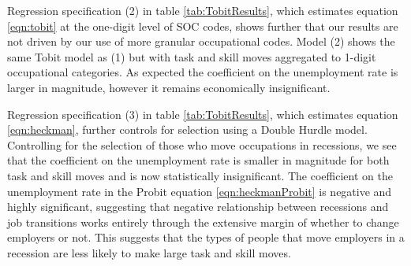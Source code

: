 \documentclass[12pt,authoryear]{elsarticle}
\begin{document}
	\vspace{2mm}
	
	Regression specification (2) in table \ref{tab:TobitResults}, which estimates equation \ref{eqn:tobit} at the one-digit level of SOC codes, shows further that our results are not driven by our use of more granular occupational codes. Model (2) shows the same Tobit model as (1) but with task and skill moves aggregated to 1-digit occupational categories. As expected the coefficient on the unemployment rate is larger in magnitude, however it remains economically insignificant.
	
	\vspace{2mm}
	
	Regression specification (3) in table \ref{tab:TobitResults}, which estimates equation \ref{eqn:heckman}, further controls for selection using a Double Hurdle model. Controlling for the selection of those who move occupations in recessions, we see that the coefficient on the unemployment rate is smaller in magnitude for both task and skill moves and is now statistically insignificant. The coefficient on the unemployment rate in the Probit equation \ref{eqn:heckmanProbit} is negative and highly significant, suggesting that negative relationship between recessions and job transitions works entirely through the extensive margin of whether to change employers or not. This suggests that the types of people that move employers in a recession are less likely to make large task and skill moves.
	
	
	
	
	\vspace{2mm}
	
\end{document}
